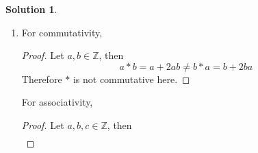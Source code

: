\documentclass[10pt]{article}
\theoremstyle{definition}
\newtheorem{soln}{Solution}
\newcommand{\justif}[2]{&{#1}&\text{#2}}
\begin{document}
\begin{soln}
\begin{enumerate}[label=(\alph*)]
\begin{proof}
            \begin{align*}
              a*b & = a+b-ab                                                             \\
                  & =b+a-ba \justif{\quad}{Commutativity of $+$ and $-$ on $\mathbb{Z}$} \\
                  & =b*a\justif{\quad}{Definition of $*$}
            \end{align*}
            Therefore $*$ is commutative. \qedhere
          \end{proof}
          For associativity,
          \begin{proof}
            Let $a,b,c\in\mathbb{Z}$, then
            \begin{align*}
              a*(b*c) & = a*(b+c-bc)                                                                 \\
                      & = a + b+c-bc + a(b+c-bc)                                                     \\
                      & = a + b+c-bc + ab+ac-abc\justif{\quad}{$\cdot$ distributive on $\mathbb{Z}$} \\
            \end{align*}
            and
            \begin{align*}
              (a*b)*c & = (a+b-ab)*c                                                                  \\
                      & = a+b-ab + c + (a+b-ab)c                                                      \\
                      & = a+b-ab + c + ac+bc-abc \justif{\quad}{$\cdot$ distributive on $\mathbb{Z}$} \\
            \end{align*}
            Because of the difference in sign on the $ab$ terms these two cannot be made to be equal, therefore $*$ is not associative. \qedhere
          \end{proof}
    \item For commutativity,
          \begin{proof}
            Let $a,b\in\mathbb{Z}$, then
            $$
              a*b = a+2ab\neq
              b*a = b+2ba
            $$
            Therefore $*$ is not commutative here. \qedhere
          \end{proof}
          For associativity,
          \begin{proof}
            Let $a,b,c\in\mathbb{Z}$, then
            \begin{align*}

\end{align*}
\end{proof}
\end{enumerate}
\end{soln}
\end{document}
